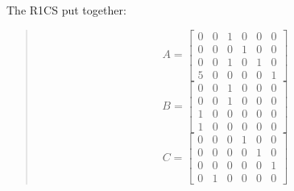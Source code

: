 The R1CS put together:
\begin{quote}
   \[
   A =
   \begin{bmatrix}
      0 & 0 & 1 & 0 & 0 & 0 \\
      0 & 0 & 0 & 1 & 0 & 0 \\
      0 & 0 & 1 & 0 & 1 & 0 \\
      5 & 0 & 0 & 0 & 0 & 1
   \end{bmatrix}
   \]
   \[
   B =
   \begin{bmatrix}
      0 & 0 & 1 & 0 & 0 & 0 \\
      0 & 0 & 1 & 0 & 0 & 0 \\
      1 & 0 & 0 & 0 & 0 & 0 \\
      1 & 0 & 0 & 0 & 0 & 0
   \end{bmatrix}
   \]
   \[
   C =
   \begin{bmatrix}
      0 & 0 & 0 & 1 & 0 & 0 \\
      0 & 0 & 0 & 0 & 1 & 0 \\
      0 & 0 & 0 & 0 & 0 & 1 \\
      0 & 1 & 0 & 0 & 0 & 0
   \end{bmatrix}
   \]
   \end{quote}
   
\cite{RC23}


